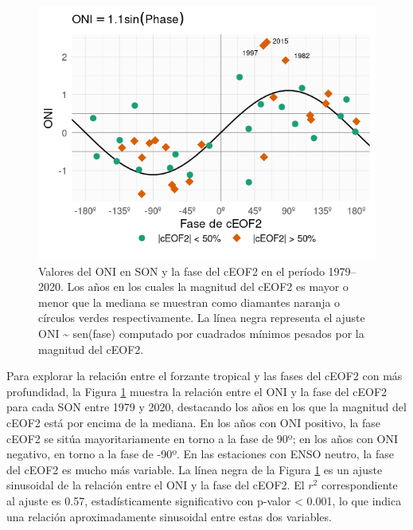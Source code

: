 \documentclass[12pt,oneside,a4paper]{reedthesis}
\begin{document}
\begin{figure}

{\centering \includegraphics{figures/20-ceofs/enso-phase-1} 

}

\caption{Valores del ONI en SON y la fase del cEOF2 en el período 1979--2020. Los años en los cuales la magnitud del cEOF2 es mayor o menor que la mediana se muestran como diamantes naranja o círculos verdes respectivamente. La línea negra representa el ajuste ONI \textasciitilde{} sen(fase) computado por cuadrados mínimos pesados por la magnitud del cEOF2.}\label{fig:enso-phase}
\end{figure}

Para explorar la relación entre el forzante tropical y las fases del cEOF2 con más profundidad, la Figura \ref{fig:enso-phase} muestra la relación entre el ONI y la fase del cEOF2 para cada SON entre 1979 y 2020, destacando los años en los que la magnitud del cEOF2 está por encima de la mediana.
En los años con ONI positivo, la fase cEOF2 se sitúa mayoritariamente en torno a la fase de 90º; en los años con ONI negativo, en torno a la fase de -90º.
En las estaciones con ENSO neutro, la fase del cEOF2 es mucho más variable.
La línea negra de la Figura \ref{fig:enso-phase} es un ajuste sinusoidal de la relación entre el ONI y la fase del cEOF2.
El \(r^2\) correspondiente al ajuste es 0.57, estadísticamente significativo con p-valor \textless{} 0.001, lo que indica una relación aproximadamente sinusoidal entre estas dos variables.
\end{document}
